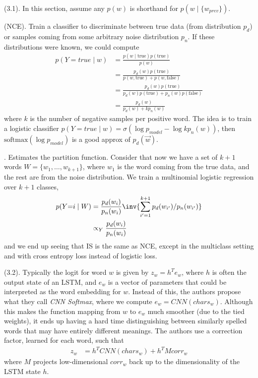 \documentclass[11pt]{article}
\begin{document}
\p {} (3.1). In this section, assume any $p(w)$ is shorthand for $p(w \mid \{w_{prev}  \} )$. 
\begin{compactitem}
	\item {} (NCE). Train a classifier to discriminate between true data (from distribution $p_d$) or samples coming from some arbitrary noise distribution $p_n$. If these distributions were known, we could compute
	\begin{align}
	p(Y {=} true \mid w)
	&= \frac{ p(w \mid \text{true} ) p(\text{true}) }{ p(w)  } \\
	&= \frac{ p_d(w)  p(\text{true}) }{ p(w, \text{true}) + p(w, \text{false})  } \\
	&= \frac{ p_d(w)  p(\text{true}) }{ p_d(w)p(\text{true}) + p_n(w)p(\text{false})  } \\
	&= \frac{ p_d(w) }{ p_d(w) + k p_n(w) } 
	\end{align}
	where $k$ is the number of negative samples per positive word. The idea is to train a logistic classifier $p(Y{=}true \mid w) = \sigma(\log p_{model} - \log k p_n(w))$, then $\text{softmax}(\log p_{model})$ is a good approx of $p_d(\vec w)$. 
	
	
	\item {}. Estimates the partition function. Consider that now we have a set of $k+1$ words $W = \{w_1, \ldots, w_{k+1} \}$, where $w_1$ is the word coming from the true data, and the rest are from the noise distribution. We train a multinomial logistic regression over $k + 1$ classes,
	\begin{align}
	p(Y{=}i \mid W) 
	&= \frac{ p_d(w_i) }{  p_n(w_i)  } \inv{ \sum_{i'=1}^{k+1} p_d(w_{i'})  /   p_n(w_{i'})} \\
	&\propto_Y  \frac{ p_d(w_i) }{  p_n(w_i)  }
	\end{align} 
	and we end up seeing that IS is the same as NCE, except in the multiclass setting and with cross entropy loss instead of logistic loss. 
\end{compactitem}


\myspace
\p {} (3.2). Typically the logit for word $w$ is given by $z_w = h^T e_w$, where $h$ is often the output state of an LSTM, and $e_w$ is a vector of parameters that could be interpreted as the word embedding for $w$. Instead of this, the authors propose what they call \textit{CNN Softmax}, where we compute $e_w = CNN(chars_w)$. Although this makes the function mapping from $w$ to $e_w$ much smoother (due to the tied weights), it ends up having a hard time distinguishing between similarly spelled words that may have entirely different meanings. The authors use a correction factor, learned for each word, such that
\begin{align}
z_w 
&= h^T CNN(chars_w) + h^T M corr_w
\end{align}
where $M$ projects low-dimensional $corr_w$ back up to the dimensionality of the LSTM state $h$. 
\end{document}

